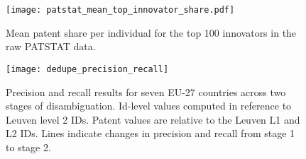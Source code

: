 \documentclass[11pt]{article}
\begin{document}



\begin{figure}[ht]
  \centering
  \texttt{[image: patstat\_mean\_top\_innovator\_share.pdf]}
  \caption{Mean patent share per individual for the top 100 innovators in the raw PATSTAT data.}
  \label{fig:patent-share}
\end{figure}

\begin{figure}[ht]
  \centering
  \texttt{[image: dedupe\_precision\_recall]}
  \caption{Precision and recall results for seven EU-27 countries
    across two stages of disambiguation. Id-level values computed in
    reference to Leuven level 2
    IDs. Patent values are relative to the Leuven L1 and L2 IDs. Lines
  indicate changes in precision and recall from stage 1 to stage 2.}
  \label{fig:dedupe-pr}
\end{figure}
\end{document}
